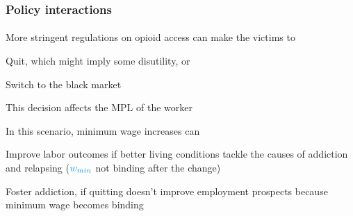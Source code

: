 \begin{frame}

    \frametitle{Policy interactions} %
    \framesubtitle{}  %
    \rmfamily %
    
    \begin{wideitemize}
        \item More stringent regulations on opioid access can make the victims to 
        \begin{wideitemize}
            \item[\textcolor{fblu}{\textbullet}] \textcolor{fblu}{Quit}, which might imply some disutility, or
            \item[\textcolor{fblu}{\textbullet}] \textcolor{fblu}{Switch to the black market}
        \end{wideitemize}
        \item This decision affects the MPL of the worker
        \item In this scenario, minimum wage increases can
        \vspace{9pt}
        \begin{wideitemize}
            \item[\textcolor{fblu}{\textbullet}] Improve labor outcomes if better living conditions tackle the causes of addiction and relapsing (\(\textcolor{fblu}{w_{min}}\) \textcolor{fblu}{not binding} after the change)
            \item[\textcolor{fblu}{\textbullet}] Foster addiction, if quitting doesn't improve employment prospects because \textcolor{fblu}{minimum wage becomes binding} 
        \end{wideitemize}
    \end{wideitemize}
    
\end{frame}

